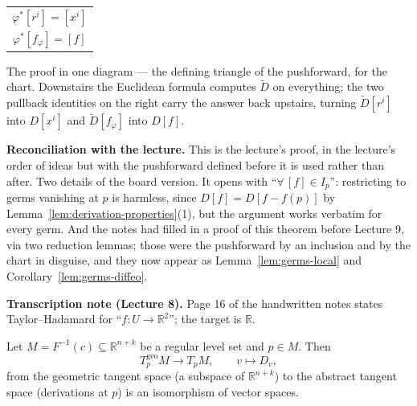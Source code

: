 \documentclass[11pt]{report}
\makeatletter
\newcounter{thmcounter}[section]
\newcommand{\thmlabel}[1]{\edef\@currentlabel{\arabic{section}.\arabic{thmcounter}}\label{#1}}
\newcommand{\geo}{\mathrm{geo}}
\newcommand{\leeref}[1]{\par\smallskip{\raggedleft\footnotesize\textsc{Lee}:\ #1\par}}
\makeatother
\begin{document}
\begin{center}
\qquad
\begin{tabular}{c}
$\varphi^*[r^i] = [x^i]$ \\[3pt]
$\varphi^*[f_\varphi] = [f]$
\end{tabular}
\end{center}

The proof in one diagram --- the defining triangle of the pushforward, for the chart. Downstairs the Euclidean formula computes $\tilde D$ on everything; the two pullback identities on the right carry the answer back upstairs, turning $\tilde D[r^i]$ into $D[x^i]$ and $\tilde D[f_\varphi]$ into $D[f]$.

\textbf{Reconciliation with the lecture.} This is the lecture's proof, in the lecture's order of ideas but with the pushforward defined before it is used rather than after. Two details of the board version. It opens with ``$\forall\, [f] \in I_p$'': restricting to germs vanishing at $p$ is harmless, since $D[f] = D[f - f(p)]$ by Lemma~\ref{lem:derivation-properties}(1), but the argument works verbatim for every germ. And the notes had filled in a proof of this theorem before Lecture 9, via two reduction lemmas; those were the pushforward by an inclusion and by the chart in disguise, and they now appear as Lemma~\ref{lem:germs-local} and Corollary~\ref{lem:germs-diffeo}.

\textbf{Transcription note (Lecture 8).} Page 16 of the handwritten notes states Taylor--Hadamard for ``$f : U \to \mathbb{R}^2$''; the target is $\mathbb{R}$.

\begin{thmbox}\thmlabel{thm:ambient-abstract}
Let $M = F^{-1}(c) \subseteq \mathbb{R}^{n+k}$ be a regular level set and $p \in M$. Then
\[
T^{\geo}_pM \longrightarrow T_pM, \qquad v \longmapsto D_v,
\]
from the geometric tangent space (a subspace of $\mathbb{R}^{n+k}$) to the abstract tangent space (derivations at $p$) is an isomorphism of vector spaces.
\leeref{Propositions 3.2, 5.37 and 5.38}
\end{thmbox}
\end{document}
